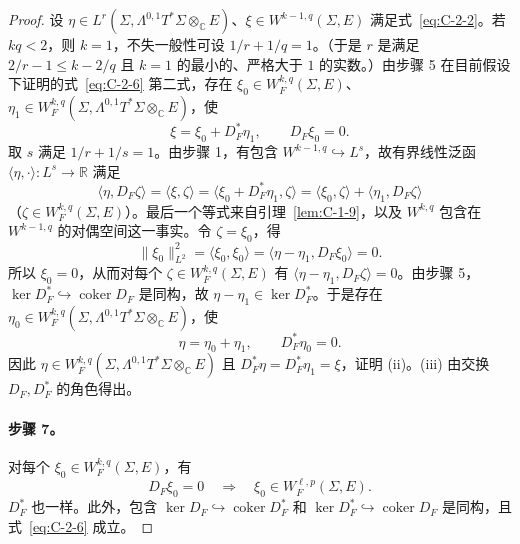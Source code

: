 \begin{proof}
设 $\eta\in L^r(\Sigma,\Lambda^{0,1}T^*\Sigma\otimes_{\mathbb C}E)$、$\xi\in W^{k-1,q}(\Sigma,E)$ 满足式~\eqref{eq:C-2-2}。若 $kq<2$，则 $k=1$，不失一般性可设 $1/r+1/q=1$。（于是 $r$ 是满足 $2/r-1\le k-2/q$ 且 $k=1$ 的最小的、严格大于 $1$ 的实数。）由步骤 5 在目前假设下证明的式~\eqref{eq:C-2-6} 第二式，存在 $\xi_0\in W_F^{k,q}(\Sigma,E)$、$\eta_1\in W_F^{k,q}(\Sigma,\Lambda^{0,1}T^*\Sigma\otimes_{\mathbb C}E)$，使
\begin{equation}\label{eq:C-2-8}
  \xi=\xi_0+D_F^*\eta_1,\qquad D_F\xi_0=0.
\end{equation}
取 $s$ 满足 $1/r+1/s=1$。由步骤 1，有包含 $W^{k-1,q}\hookrightarrow L^s$，故有界线性泛函 $\langle\eta,\cdot\rangle:L^s\to\mathbb R$ 满足
\begin{equation}\label{eq:C-2-9}
  \langle\eta,D_F\zeta\rangle
  =\langle\xi,\zeta\rangle
  =\langle\xi_0+D_F^*\eta_1,\zeta\rangle
  =\langle\xi_0,\zeta\rangle+\langle\eta_1,D_F\zeta\rangle
\end{equation}
（$\zeta\in W_F^{k,q}(\Sigma,E)$）。最后一个等式来自引理~\ref{lem:C-1-9}，以及 $W^{k,q}$ 包含在 $W^{k-1,q}$ 的对偶空间这一事实。令 $\zeta=\xi_0$，得
\[
  \|\xi_0\|_{L^2}^2
  =\langle\xi_0,\xi_0\rangle
  =\langle\eta-\eta_1,D_F\xi_0\rangle=0.
\]
所以 $\xi_0=0$，从而对每个 $\zeta\in W_F^{k,q}(\Sigma,E)$ 有 $\langle\eta-\eta_1,D_F\zeta\rangle=0$。由步骤 5，$\ker D_F^*\hookrightarrow\operatorname{coker}D_F$ 是同构，故 $\eta-\eta_1\in\ker D_F^*$。于是存在 $\eta_0\in W_F^{k,q}(\Sigma,\Lambda^{0,1}T^*\Sigma\otimes_{\mathbb C}E)$，使
\[
  \eta=\eta_0+\eta_1,\qquad D_F^*\eta_0=0.
\]
因此 $\eta\in W_F^{k,q}(\Sigma,\Lambda^{0,1}T^*\Sigma\otimes_{\mathbb C}E)$ 且 $D_F^*\eta=D_F^*\eta_1=\xi$，证明 (ii)。(iii) 由交换 $D_F,D_F^*$ 的角色得出。

\paragraph{步骤 7。} 对每个 $\xi_0\in W_F^{k,q}(\Sigma,E)$，有
\begin{equation}\label{eq:C-2-10}
  D_F\xi_0=0\quad\Longrightarrow\quad\xi_0\in W_F^{\ell,p}(\Sigma,E).
\end{equation}
$D_F^*$ 也一样。此外，包含 $\ker D_F\hookrightarrow\operatorname{coker}D_F^*$ 和 $\ker D_F^*\hookrightarrow\operatorname{coker}D_F$ 是同构，且式~\eqref{eq:C-2-6} 成立。


\end{proof}

